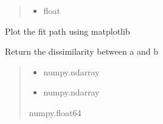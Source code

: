 \documentclass[letterpaper,10pt,english]{sphinxmanual}
\begin{document}
\begin{fulllineitems}
\begin{fulllineitems}
\begin{quote}
\begin{description}
\begin{itemize}
\item {} 
\sphinxAtStartPar
{} \textendash{} float

\end{itemize}

\end{description}\end{quote}

\end{fulllineitems}


\begin{fulllineitems}
\label{\detokenize{som:som.kohonen.SOM.plot_path}}
\pysigstartsignatures
{}
\pysigstopsignatures
\sphinxAtStartPar
Plot the fit path using matplotlib

\end{fulllineitems}


\end{fulllineitems}


\begin{fulllineitems}
\label{\detokenize{som:som.kohonen.dissimilarity}}
\pysigstartsignatures
{}
\pysigstopsignatures
\sphinxAtStartPar
Return the dissimilarity between a and b
\begin{quote}\begin{description}
\begin{itemize}
\item {} 
\sphinxAtStartPar
{} \textendash{} numpy.ndarray

\item {} 
\sphinxAtStartPar
{} \textendash{} numpy.ndarray

\end{itemize}

\sphinxAtStartPar
numpy.float64

\end{description}\end{quote}

\end{fulllineitems}
\end{document}
